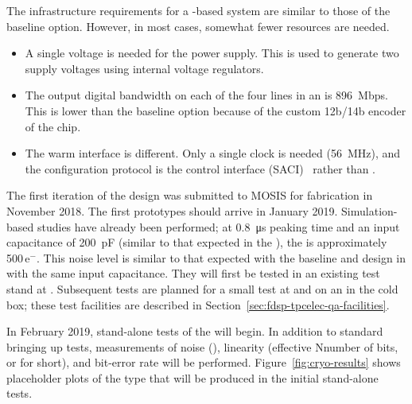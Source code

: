
The infrastructure requirements for a  -based system are similar to those of the baseline option. However, in most cases, somewhat fewer resources are needed.
\begin{itemize}
\item{A single voltage is needed for the power supply. This is used to generate two supply voltages using internal voltage regulators.}
\item{The output digital bandwidth on each of the four lines in an  is \SI{896}{Mbps}. This is lower than the baseline option because of the custom 12b/14b encoder of the  chip. }
\item{The warm interface is different. Only a single clock is needed (\SI{56}{MHz}), and the configuration protocol is the   control interface (SACI)~\cite{SACI} rather than .} 
\end{itemize}

The first iteration of the   design was submitted to MOSIS  for fabrication in November 2018.  The first prototypes should arrive in January 2019. Simulation-based studies have already been performed; at \SI{0.8}{\micro\second} peaking time and an input capacitance of \SI{200}{pF} (similar to that expected in the  ), the  is approximately \num{500}\,e$^-$.  This noise level is similar to that expected with the baseline  and   design in  with the same input capacitance.  They will first be tested in an existing test stand at .  Subsequent tests are planned for a small test  at  and on an  in the  cold box; these test facilities are described in Section~\ref{sec:fdsp-tpcelec-qa-facilities}.

In February 2019, stand-alone tests of the   will begin. In addition to standard bringing up tests, measurements of noise (), linearity (effective Nnumber of bits, or  for short), and bit-error rate will be performed. Figure~\ref{fig:cryo-results} shows placeholder plots of the type that will be produced in the initial stand-alone tests.

